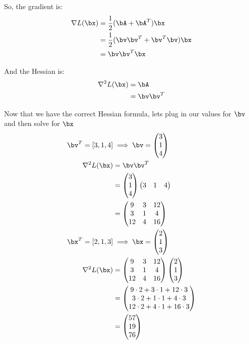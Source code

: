 \documentclass[12pt]{article}
\begin{document}
So, the gradient is:
\begin{align*}
		\nabla L(\bx) &= \frac{1}{2}(\bA+\bA^T)\bx \\
		&= \frac{1}{2}(\bv\bv^T + \bv^T\bv)\bx \\
		&= \bv\bv^T\bx
\end{align*}

And the Hessian is:
\begin{align*}
		\nabla^2 L(\bx) &= \bA \\
		&= \bv\bv^T
\end{align*}

Now that we have the correct Hessian formula, lets plug in our values for $\bv$ and then solve for $\bx$
\begin{align*}
		\bv^T = [3,1,4] &\implies \bv =
		\begin{pmatrix}
				3 \\
				1 \\
				4
		\end{pmatrix} \\
		\nabla^2 L(\bx) &= \bv\bv^T \\
		&=
		\begin{pmatrix}
				3 \\
				1 \\
				4
		\end{pmatrix}
		\begin{pmatrix}
				3 & 1 & 4
		\end{pmatrix} \\
		&=
		\begin{pmatrix}
				9 & 3 & 12 \\	
				3 & 1 & 4 \\
				12 & 4 & 16
		\end{pmatrix}\\
		\bx^T = [2,1,3] &\implies \bx =
		\begin{pmatrix}
				2 \\
				1 \\
				3
		\end{pmatrix} \\
		\nabla^2 L(\bx) &=
		\begin{pmatrix}
				9 & 3 & 12 \\	
				3 & 1 & 4 \\
				12 & 4 & 16
		\end{pmatrix}
		\begin{pmatrix}
				2 \\
				1 \\
				3
		\end{pmatrix} \\
		&=
		\begin{pmatrix}
				9\cdot 2 + 3\cdot 1 + 12	\cdot 3 \\
				3\cdot 2 + 1\cdot 1 + 4 \cdot 3 \\
				12\cdot 2 + 4\cdot 1 + 16 \cdot 3
		\end{pmatrix} \\
		&=
		\begin{pmatrix}
				57 \\
				19 \\
				76
		\end{pmatrix}
\end{align*}
\end{document}
